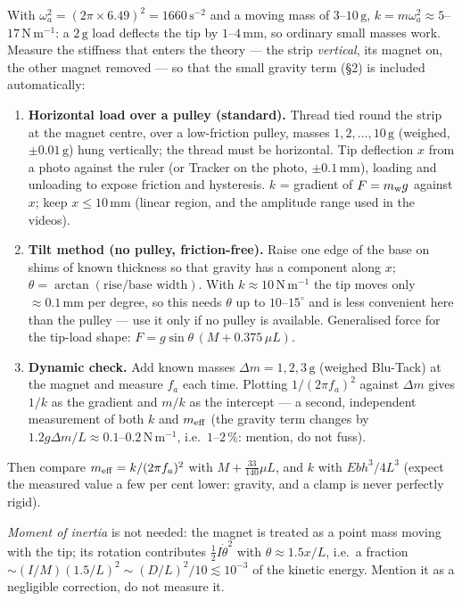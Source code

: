 \documentclass[11pt,a4paper]{article}
\newcommand{\un}[1]{\,\mathrm{#1}}
\begin{document}
With $\omega_a^2=(2\pi\times6.49)^2=1660\un{s^{-2}}$ and a moving mass of $3$--$10\un{g}$, $k=m\omega_a^2\approx5$--$17\un{N\,m^{-1}}$: a $2\un{g}$ load deflects the tip by $1$--$4\un{mm}$, so ordinary small masses work. Measure the stiffness that enters the theory --- the strip \emph{vertical}, its magnet on, the other magnet removed --- so that the small gravity term (\S2) is included automatically:
\begin{enumerate}[leftmargin=1.6em,itemsep=1pt]
\item \textbf{Horizontal load over a pulley (standard).} Thread tied round the strip at the magnet centre, over a low-friction pulley, masses $1,2,\dots,10\un{g}$ (weighed, $\pm0.01\un{g}$) hung vertically; the thread must be horizontal. Tip deflection $x$ from a photo against the ruler (or Tracker on the photo, $\pm0.1\un{mm}$), loading and unloading to expose friction and hysteresis. $k$ = gradient of $F=m_{\rm w}g$ against $x$; keep $x\le10\un{mm}$ (linear region, and the amplitude range used in the videos).
\item \textbf{Tilt method (no pulley, friction-free).} Raise one edge of the base on shims of known thickness so that gravity has a component along $x$; $\theta=\arctan(\text{rise}/\text{base width})$. With $k\approx10\un{N\,m^{-1}}$ the tip moves only $\approx0.1\un{mm}$ per degree, so this needs $\theta$ up to $10$--$15^\circ$ and is less convenient here than the pulley --- use it only if no pulley is available. Generalised force for the tip-load shape: $F=g\sin\theta\,(M+0.375\,\mu L)$.
\item \textbf{Dynamic check.} Add known masses $\Delta m=1,2,3\un{g}$ (weighed Blu-Tack) at the magnet and measure $f_a$ each time. Plotting $1/(2\pi f_a)^2$ against $\Delta m$ gives $1/k$ as the gradient and $m/k$ as the intercept --- a second, independent measurement of both $k$ and $m_{\rm eff}$ (the gravity term changes by $1.2g\Delta m/L\approx0.1$--$0.2\un{N\,m^{-1}}$, i.e.\ $1$--$2\,\%$: mention, do not fuss).
\end{enumerate}
Then compare $m_{\rm eff}=k/(2\pi f_a)^2$ with $M+\frac{33}{140}\mu L$, and $k$ with $Ebh^3/4L^3$ (expect the measured value a few per cent lower: gravity, and a clamp is never perfectly rigid).

\textit{Moment of inertia} is not needed: the magnet is treated as a point mass moving with the tip; its rotation contributes $\tfrac12 I\dot\theta^2$ with $\theta\approx1.5x/L$, i.e.\ a fraction $\sim(I/M)(1.5/L)^2\sim(D/L)^2/10\lesssim10^{-3}$ of the kinetic energy. Mention it as a negligible correction, do not measure it.
\end{document}
